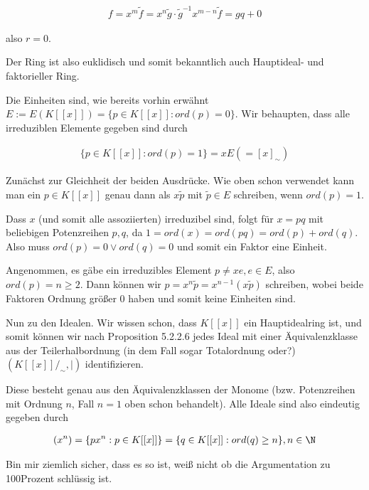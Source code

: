 \begin{solution}
\begin{align*}
  f = x^m \tilde{f} = x^n\tilde{g} \cdot \tilde{g}^{-1}x^{m-n}\tilde{f} = gq + 0
\end{align*}

also $r = 0$.

Der Ring ist also euklidisch und somit bekanntlich auch Hauptideal- und faktorieller Ring.

Die Einheiten sind, wie bereits vorhin erwähnt $E := E(K[[x]]) = \{p \in K[[x]]: ord(p) = 0\}$. Wir behaupten, dass alle irreduziblen Elemente gegeben sind durch

\begin{align*}
  \{p \in K[[x]]: ord(p) = 1\} = xE ( = [x]_{\sim})
\end{align*}

Zunächst zur Gleichheit der beiden Ausdrücke. Wie oben schon verwendet kann man ein $p \in K[[x]]$ genau dann als $x\tilde{p}$ mit $\tilde{p} \in E$ schreiben, wenn $ord(p) = 1$.

Dass $x$ (und somit alle assoziierten) irreduzibel sind, folgt für $x = pq$ mit beliebigen Potenzreihen $p,q$, da $1 = ord(x) = ord(pq) = ord(p) + ord(q)$. Also muss $ord(p) = 0 \lor ord(q) = 0$ und somit ein Faktor eine Einheit.

Angenommen, es gäbe ein irreduzibles Element $p \neq xe, e \in E$, also $ord(p) = n \geq 2$. Dann können wir $p = x^n\tilde{p} = x^{n-1} (x\tilde{p})$ schreiben, wobei beide Faktoren Ordnung größer 0 haben und somit keine Einheiten sind.

Nun zu den Idealen. Wir wissen schon, dass $K[[x]]$ ein Hauptidealring ist, und somit können wir nach Proposition 5.2.2.6 jedes Ideal mit einer Äquivalenzklasse aus der Teilerhalbordnung (in dem Fall sogar Totalordnung oder?) $(K[[x]]/_{\sim},|)$ identifizieren.

Diese besteht genau aus den Äquivalenzklassen der Monome (bzw. Potenzreihen mit Ordnung $n$, Fall $n=1$ oben schon behandelt). Alle Ideale sind also eindeutig gegeben durch

\begin{align*}
  (x^n) = \{px^n: p \in K[[x]]\} = \{q \in K[[x]]: ord(q) \geq n\}, n \in \N
\end{align*}

Bin mir ziemlich sicher, dass es so ist, weiß nicht ob die Argumentation zu 100Prozent schlüssig ist.


\end{solution}
